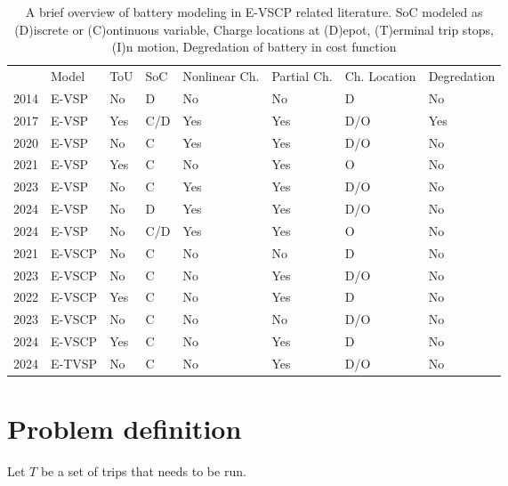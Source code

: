 \documentclass[ht]{article}
\begin{document}
\begin{table}[h]
  \centering
  \begin{tabular}{clllllll}
    \toprule
                                     & Model  & ToU & SoC & Nonlinear Ch. & Partial Ch. & Ch. Location & Degredation \\
    \cmidrule(lr){2-8}
    \cite{Li2014} 2014               & E-VSP  & No  & D   & No            & No          & D            & No          \\
    \cite{vanKootenNiekerk2017} 2017 & E-VSP  & Yes & C/D & Yes           & Yes         & D/O          & Yes         \\
    \cite{Olsen2020} 2020            & E-VSP  & No  & C   & Yes           & Yes         & D/O          & No          \\
    \cite{Jiang2021} 2021            & E-VSP  & Yes & C   & No            & Yes         & O            & No          \\
    \cite{Parmentier2023} 2023       & E-VSP  & No  & C   & Yes           & Yes         & D/O          & No          \\
    \cite{deVos2024} 2024            & E-VSP  & No  & D   & Yes           & Yes         & D/O          & No          \\
    \cite{Pulyassary2024} 2024       & E-VSP  & No  & C/D & Yes           & Yes         & O            & No          \\
    \addlinespace[0.4em]
    \cite{Perumal2021} 2021          & E-VSCP & No  & C   & No            & No          & D            & No          \\
    \cite{Sistig2023} 2023           & E-VSCP & No  & C   & No            & Yes         & D/O          & No          \\
    \cite{Wang2022} 2022             & E-VSCP & Yes & C   & No            & Yes         & D            & No          \\
    \cite{Shen2023} 2023             & E-VSCP & No  & C   & No            & No          & D/O          & No          \\
    \cite{Cong2024} 2024             & E-VSCP & Yes & C   & No            & Yes         & D            & No          \\
    \addlinespace[0.4em]
    \cite{Stadnichuk2024} 2024       & E-TVSP & No  & C   & No            & Yes         & D/O          & No          \\
    \bottomrule
  \end{tabular}
  \caption{A brief overview of battery modeling in E-VSCP related literature. SoC modeled as (D)iscrete or (C)ontinuous variable, Charge locations at (D)epot, (T)erminal trip stops, (I)n motion, Degredation of battery in cost function}
  \label{tab:evscp-lit}
\end{table}

\section{Problem definition}
\label{sec:problem_def}
Let $T$ be a set of trips that needs to be run.
\printbibliography
\end{document}

